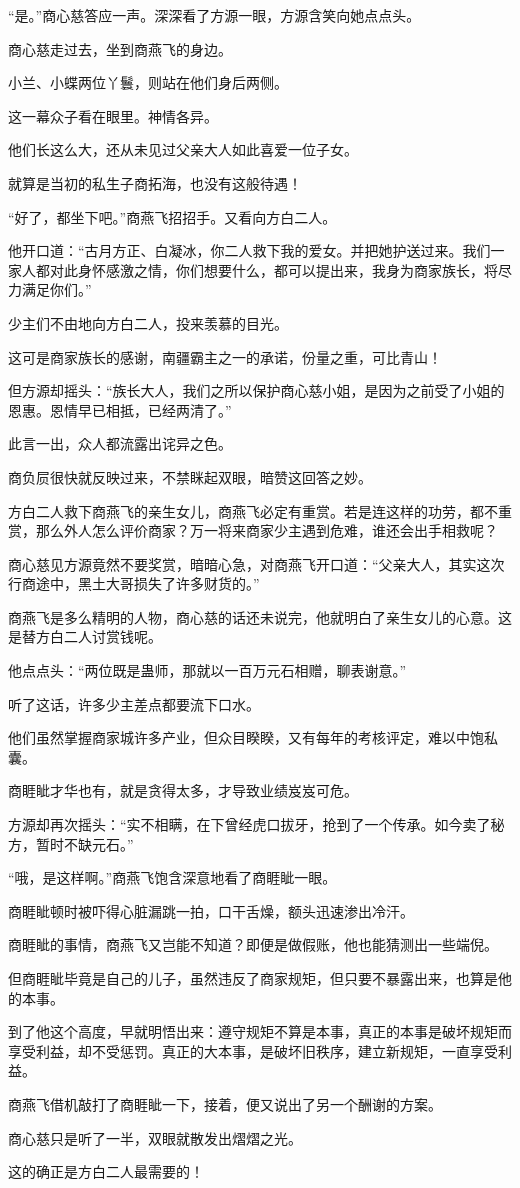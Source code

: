 \begin{this_body}
“是。”商心慈答应一声。深深看了方源一眼，方源含笑向她点点头。

商心慈走过去，坐到商燕飞的身边。

小兰、小蝶两位丫鬟，则站在他们身后两侧。

这一幕众子看在眼里。神情各异。

他们长这么大，还从未见过父亲大人如此喜爱一位子女。

就算是当初的私生子商拓海，也没有这般待遇！

“好了，都坐下吧。”商燕飞招招手。又看向方白二人。

他开口道：“古月方正、白凝冰，你二人救下我的爱女。并把她护送过来。我们一家人都对此身怀感激之情，你们想要什么，都可以提出来，我身为商家族长，将尽力满足你们。”

少主们不由地向方白二人，投来羡慕的目光。

这可是商家族长的感谢，南疆霸主之一的承诺，份量之重，可比青山！

但方源却摇头：“族长大人，我们之所以保护商心慈小姐，是因为之前受了小姐的恩惠。恩情早已相抵，已经两清了。”

此言一出，众人都流露出诧异之色。

商负屃很快就反映过来，不禁眯起双眼，暗赞这回答之妙。

方白二人救下商燕飞的亲生女儿，商燕飞必定有重赏。若是连这样的功劳，都不重赏，那么外人怎么评价商家？万一将来商家少主遇到危难，谁还会出手相救呢？

商心慈见方源竟然不要奖赏，暗暗心急，对商燕飞开口道：“父亲大人，其实这次行商途中，黑土大哥损失了许多财货的。”

商燕飞是多么精明的人物，商心慈的话还未说完，他就明白了亲生女儿的心意。这是替方白二人讨赏钱呢。

他点点头：“两位既是蛊师，那就以一百万元石相赠，聊表谢意。”

听了这话，许多少主差点都要流下口水。

他们虽然掌握商家城许多产业，但众目睽睽，又有每年的考核评定，难以中饱私囊。

商睚眦才华也有，就是贪得太多，才导致业绩岌岌可危。

方源却再次摇头：“实不相瞒，在下曾经虎口拔牙，抢到了一个传承。如今卖了秘方，暂时不缺元石。”

“哦，是这样啊。”商燕飞饱含深意地看了商睚眦一眼。

商睚眦顿时被吓得心脏漏跳一拍，口干舌燥，额头迅速渗出冷汗。

商睚眦的事情，商燕飞又岂能不知道？即便是做假账，他也能猜测出一些端倪。

但商睚眦毕竟是自己的儿子，虽然违反了商家规矩，但只要不暴露出来，也算是他的本事。

到了他这个高度，早就明悟出来：遵守规矩不算是本事，真正的本事是破坏规矩而享受利益，却不受惩罚。真正的大本事，是破坏旧秩序，建立新规矩，一直享受利益。

商燕飞借机敲打了商睚眦一下，接着，便又说出了另一个酬谢的方案。

商心慈只是听了一半，双眼就散发出熠熠之光。

这的确正是方白二人最需要的！

\end{this_body}

